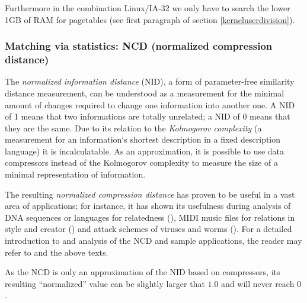 Furthermore in the combination Linux/IA-32 we only have to search the lower 1GB
of RAM for pagetables (see first paragraph of section \ref{kerneluserdivision}).



\subsubsection{Matching via statistics: NCD (normalized compression distance)}

\label{ATTstatistics} The \emph{normalized information distance} (NID), a form
of parameter-free similarity distance measurement, can be understood as a
measurement for the minimal amount of changes required to change one information
into another one.  A NID of 1 means that two informations are totally unrelated;
a NID of 0 means that they are the same.  Due to its relation to the
\emph{Kolmogorov complexity} (a measurement for an information`s shortest
description in a fixed description language) it is incalculatable.  As an
approximation, it is possible to use data compressors instead of the Kolmogorov
complexity to measure the size of a minimal representation of information.

%

The resulting \emph{normalized compression distance} has proven to be useful in
a vast area of applications; for instance, it has shown its usefulness during
analysis of DNA sequences or languages for relatedness
(\cite{clustering_by_compression:2005,similarity_matrix:2004}), MIDI music files
for relations in style and creator (\cite{clustering_by_compression:2005}) and
attack schemes of viruses and worms (\cite{analysing_worms_with_ncd:2006}).  For
a detailed introduction to and analysis of the NCD and sample applications, the
reader may refer to \cite{kolmogorov:1997} and the above texts.

As the NCD is only an approximation of the NID based on compressors, its
resulting ``normalized'' value can be slightly larger that $1.0$ and will never
reach $0$.

